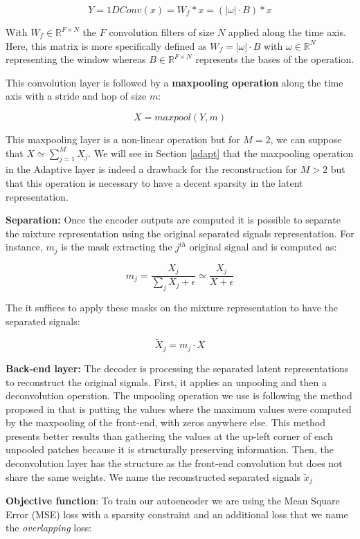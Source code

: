 \documentclass[master,final,11pt]{iscs-thesis}
\begin{document}
\[Y = 1DConv(x) = W_{f} \ast x = (|\omega| \cdot B) \ast x\]

With $W_f \in \mathbb{R}^{F\times N}$ the $F$ convolution filters of size $N$ applied along the time axis. Here, this matrix is more specifically defined as $W_f = |\omega|\cdot B$ with $\omega \in \mathbb{R}^{N}$ representing the window whereas $B \in \mathbb{R}^{F\times N}$ represents the bases of the operation.

This convolution layer is followed by a \textbf{maxpooling operation} along the time axis with a stride and hop of size $m$:

\[X = maxpool(Y, m)\]

This maxpooling layer is a non-linear operation but for $M = 2$, we can suppose that $X \simeq \sum_{j=1}^{M}{X_j}$. We will see in Section \ref{adapt} that the maxpooling operation in the Adaptive layer is indeed a drawback for the reconstruction for $M > 2$ but that this operation is necessary to have a decent sparsity in the latent representation.

\textbf{Separation:} Once the encoder outputs are computed it is possible to separate the mixture representation using the original separated signals representation. For instance, $m_j$ is the mask extracting the $j^{th}$ original signal and is computed as:

\[m_j = \frac{X_j}{\sum_j{X_j} + \epsilon} \simeq  \frac{X_j}{X + \epsilon}\]

The it suffices to apply these masks on the mixture representation to have the separated signals:

\[\tilde X _j = m_j \cdot X\]

\textbf{Back-end layer:} The decoder is processing the separated latent representations to reconstruct the original signals. First, it applies an unpooling and then a deconvolution operation. The unpooling operation we use is following the method proposed in \cite{unpool} that is putting the values where the maximum values were computed by the maxpooling of the front-end, with zeros anywhere else. This method presents better results than gathering the values at the up-left corner of each unpooled patches because it is structurally preserving information. Then, the deconvolution layer has the structure as the front-end convolution but does not share the same weights. We name the reconstructed separated signals $\tilde x _j$

\textbf{Objective function}: To train our autoencoder we are using the Mean Square Error (MSE) loss with a sparsity constraint and an additional loss that we name the \textit{overlapping} loss:
\end{document}
